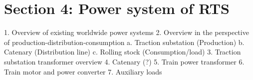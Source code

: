 




\section{Section 4: Power system of RTS}

1.	Overview of existing worldwide power systems
2.	Overview in the perspective of production-distribution-consumption
a.	Traction substation (Production)
b.	Catenary (Distribution line)
c.	Rolling stock (Consumption/load)
3.	Traction substation transformer overview
4.	Catenary (?)
5.	Train power transformer
6.	Train motor and power converter
7.	Auxiliary loads